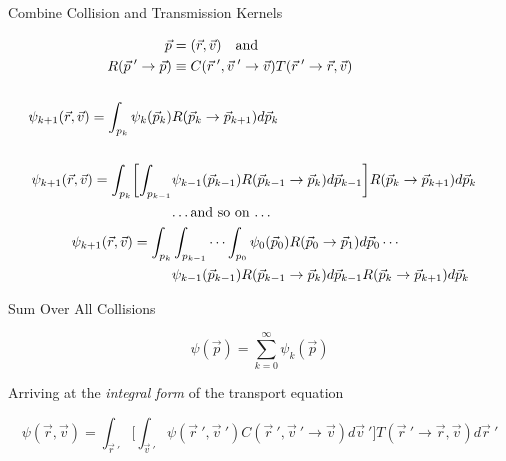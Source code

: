 \documentclass[xcolor=x11names,compress]{beamer}
\renewcommand{\(}{\begin{columns}}
\renewcommand{\)}{\end{columns}}
\newcommand{\<}[1]{\begin{column}{#1}}
\renewcommand{\>}{\end{column}}
\begin{document}
\begin{frame}{Combine Collision and Transmission Kernels}

\begin{align*}
\vec{p} &= (\vec{r}, \vec{v}) \quad \text{and}\\
%
R(\vec{p}\:'\rightarrow\vec{p}) &\equiv C(\vec{r}\:', \vec{v}\:' \rightarrow \vec{v}) T(\vec{r}\:' \rightarrow \vec{r}, \vec{v}) \\
&\\
%
\psi_{k+1}(\vec{r}, \vec{v}) = \int_{p_k} \psi_k(\vec{p}_k) &R(\vec{p}_k \rightarrow \vec{p}_{k+1}) d\vec{p}_k \\
%
&\\
\psi_{k+1}(\vec{r}, \vec{v}) = \int_{p_k} \biggl[ \int_{p_{k-1}}  &\psi_{k-1}(\vec{p}_{k-1}) R(\vec{p}_{k-1} \rightarrow \vec{p}_{k}) d\vec{p}_{k-1} \biggr] R(\vec{p}_k \rightarrow \vec{p}_{k+1}) d\vec{p}_k \\
&\text{\dots and so on \dots}
&\\
\psi_{k+1}(\vec{r}, \vec{v}) = \int_{p_k} &\int_{p_{k-1}} \cdots \int_{p_0} \psi_{0}(\vec{p}_{0}) R(\vec{p}_{0} \rightarrow \vec{p}_{1}) d\vec{p}_{0} \cdots \\
&\psi_{k-1}(\vec{p}_{k-1}) R(\vec{p}_{k-1} \rightarrow \vec{p}_{k}) d\vec{p}_{k-1} R(\vec{p}_k \rightarrow \vec{p}_{k+1}) d\vec{p}_k \\
\end{align*}

\end{frame}


\begin{frame}{Sum Over All Collisions}

\[\psi(\vec{p}) = \sum_{k=0}^{\infty} \psi_k(\vec{p})\]

\vspace*{1 em}
Arriving at the \textit{integral form} of the transport equation

\[\psi(\vec{r}, \vec{v}) = \int_{\vec{r}\:'} \biggl[ \int_{\vec{v}\:'} \psi(\vec{r}\:', \vec{v}\:') C(\vec{r}\:', \vec{v}\:' \rightarrow \vec{v})  d\vec{v}\:'\biggr] T(\vec{r}\:' \rightarrow \vec{r}, \vec{v}) d\vec{r}\:'\]

\end{frame}
\end{document}
